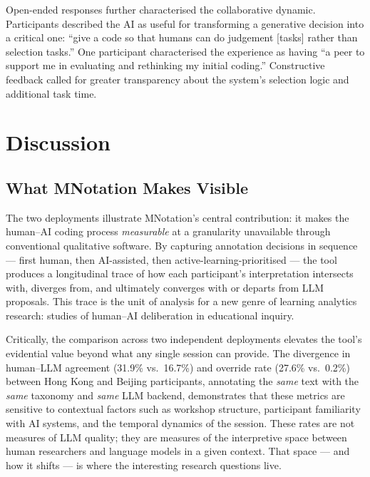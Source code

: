 \documentclass[fleqn,10pt]{JLA_article}
\begin{document}
Open-ended responses further characterised the collaborative dynamic. Participants described
the AI as useful for transforming a generative decision into a critical one: ``give a code so
that humans can do judgement [tasks] rather than selection tasks.'' One participant
characterised the experience as having ``a peer to support me in evaluating and rethinking
my initial coding.'' Constructive feedback called for greater transparency about the
system's selection logic and additional task time.

\section{Discussion}

\subsection{What MNotation Makes Visible}

The two deployments illustrate MNotation's central contribution: it makes the human--AI
coding process \emph{measurable} at a granularity unavailable through conventional
qualitative software. By capturing annotation decisions in sequence — first human, then
AI-assisted, then active-learning-prioritised — the tool produces a longitudinal trace of
how each participant's interpretation intersects with, diverges from, and ultimately
converges with or departs from LLM proposals. This trace is the unit of analysis for a
new genre of learning analytics research: studies of human--AI deliberation in educational
inquiry.

Critically, the comparison across two independent deployments elevates the tool's
evidential value beyond what any single session can provide. The divergence in human--LLM
agreement (31.9\% vs.\ 16.7\%) and override rate (27.6\% vs.\ 0.2\%) between Hong Kong
and Beijing participants, annotating the \emph{same} text with the \emph{same} taxonomy
and \emph{same} LLM backend, demonstrates that these metrics are sensitive to contextual
factors such as workshop structure, participant familiarity with AI systems, and the
temporal dynamics of the session. These rates are not measures of LLM quality; they are
measures of the interpretive space between human researchers and language models in a
given context. That space — and how it shifts — is where the interesting research
questions live.
\end{document}
